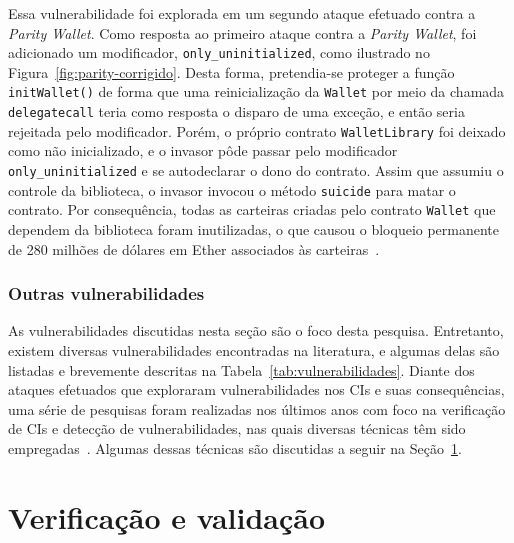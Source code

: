 Essa vulnerabilidade foi explorada em um segundo ataque efetuado contra a \textit{Parity Wallet}. Como resposta ao primeiro ataque contra a \textit{Parity Wallet}, foi adicionado um modificador, \texttt{only\_uninitialized}, como ilustrado no Figura~\ref{fig:parity-corrigido}. Desta forma, pretendia-se proteger a função \texttt{initWallet()} de forma que uma reinicialização da \texttt{Wallet} por meio da chamada \texttt{delegatecall} teria como resposta o disparo de uma exceção, e então seria rejeitada pelo modificador. Porém, o próprio contrato \texttt{WalletLibrary} foi deixado como não inicializado, e o invasor pôde passar pelo modificador \texttt{only\_uninitialized} e se autodeclarar o dono do  contrato. Assim que assumiu o controle da biblioteca, o invasor invocou o método \texttt{suicide} para matar o contrato. Por consequência, todas as carteiras criadas pelo contrato \texttt{Wallet} que dependem da biblioteca foram inutilizadas, o que causou o bloqueio permanente de 280 milhões de dólares em Ether associados às carteiras~\cite{chen2020survey-ethereum-acm, destefanis2018smart-parity-wallet}.



\subsubsection*{\textbf{Outras vulnerabilidades}}

As vulnerabilidades discutidas nesta seção são o foco desta pesquisa. Entretanto, existem diversas vulnerabilidades encontradas na literatura, e algumas delas são listadas e brevemente descritas na Tabela~\ref{tab:vulnerabilidades}. Diante dos ataques efetuados que exploraram vulnerabilidades nos CIs e suas consequências, uma série de pesquisas foram realizadas nos últimos anos com foco na verificação de CIs e detecção de vulnerabilidades, nas quais diversas técnicas têm sido empregadas~\cite{chen2020survey-ethereum-acm, almakhour2020verification-survey, liu2019survey-ieeeaccess, singh2020survey-vulnerabilities-elsevier}. Algumas dessas técnicas são discutidas a seguir na Seção~\ref{tex:fund:verificacao}.



\section{Verificação e validação} \label{tex:fund:verificacao}

